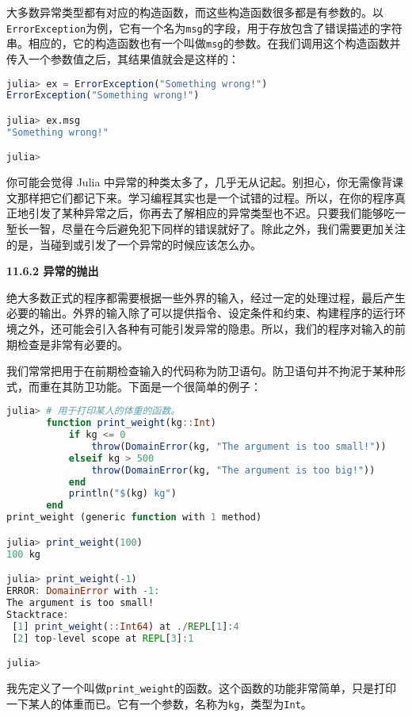 大多数异常类型都有对应的构造函数，而这些构造函数很多都是有参数的。以\verb`ErrorException`为例，它有一个名为\verb`msg`的字段，用于存放包含了错误描述的字符串。相应的，它的构造函数也有一个叫做\verb`msg`的参数。在我们调用这个构造函数并传入一个参数值之后，其结果值就会是这样的：

\begin{lstlisting}[language=julia]
julia> ex = ErrorException("Something wrong!")
ErrorException("Something wrong!")

julia> ex.msg
"Something wrong!"

julia> 
\end{lstlisting}

你可能会觉得 Julia 中异常的种类太多了，几乎无从记起。别担心，你无需像背课文那样把它们都记下来。学习编程其实也是一个试错的过程。所以，在你的程序真正地引发了某种异常之后，你再去了解相应的异常类型也不迟。只要我们能够吃一堑长一智，尽量在今后避免犯下同样的错误就好了。除此之外，我们需要更加关注的是，当碰到或引发了一个异常的时候应该怎么办。

\textbf{11.6.2 异常的抛出}

绝大多数正式的程序都需要根据一些外界的输入，经过一定的处理过程，最后产生必要的输出。外界的输入除了可以提供指令、设定条件和约束、构建程序的运行环境之外，还可能会引入各种有可能引发异常的隐患。所以，我们的程序对输入的前期检查是非常有必要的。

我们常常把用于在前期检查输入的代码称为防卫语句。防卫语句并不拘泥于某种形式，而重在其防卫功能。下面是一个很简单的例子：

\begin{lstlisting}[language=julia]
julia> # 用于打印某人的体重的函数。
       function print_weight(kg::Int)
           if kg <= 0
               throw(DomainError(kg, "The argument is too small!"))
           elseif kg > 500 
               throw(DomainError(kg, "The argument is too big!"))
           end
           println("$(kg) kg")
       end
print_weight (generic function with 1 method)

julia> print_weight(100)
100 kg

julia> print_weight(-1)
ERROR: DomainError with -1:
The argument is too small!
Stacktrace:
 [1] print_weight(::Int64) at ./REPL[1]:4
 [2] top-level scope at REPL[3]:1

julia> 
\end{lstlisting}

我先定义了一个叫做\verb`print_weight`的函数。这个函数的功能非常简单，只是打印一下某人的体重而已。它有一个参数，名称为\verb`kg`，类型为\verb`Int`。

